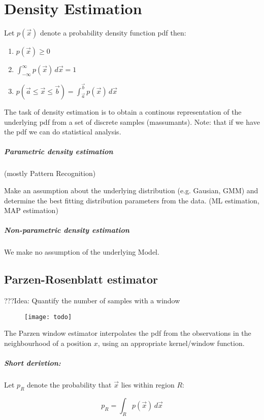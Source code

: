 
\section{Density Estimation}
Let $p(\vec{x})$ denote a probability density function pdf then:

\begin{enumerate}
  \item $p(\vec{x}) \ge 0$
  \item $\int_{-\infty}^\infty p(\vec{x}) \,d\vec{x} = 1$
  \item $p(\vec{a} \le \vec{x} \le \vec{b}) = \int_{\vec{a}}^{\vec{b}} p(\vec{x}) \,d\vec{x}$
\end{enumerate}

The task of density estimation is to obtain a continous representation of the underlying pdf from a set of discrete samples (massumants). Note: that if we have the pdf we can do statistical analysis.

\subparagraph{Parametric density estimation}
(mostly Pattern Recognition)

Make an assumption about the underlying distribution (e.g. Gausian, GMM) and determine the best fitting distribution parameters from the data. (ML estimation, MAP estimation)

\subparagraph{Non-parametric density estimation}

We make no assumption of the underlying Model.

\subsection{Parzen-Rosenblatt estimator}
???Idea: Quantify the number of samples with a window

\begin{figure}[H]
  \centering
  \texttt{[image: todo]}
\end{figure}

The Parzen window estimator interpolates the pdf from the observations in the neighbourhood of a position $x$, using an appropriate kernel/window function.

\subparagraph{Short derivtion:}
Let $p_R$ denote the probability that $\vec{x}$ lies within region $R$:

\begin{equation*}
  p_R = \int_R p(\vec{x}) \,d\vec{x}
\end{equation*}

